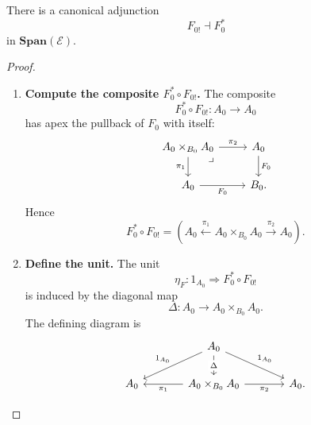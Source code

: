 \begin{proposition}
\label{prop:canonical-span-adjunction}
    There is a canonical adjunction
    \[
        F_{0!}\dashv F_0^\ast
    \]
    in \(\mathbf{Span}(\mathcal E)\).
\end{proposition}
\begin{proof}
    \leavevmode
    \begin{enumerate}
        \item \textbf{Compute the composite \(F_0^\ast\circ F_{0!}\).} The composite
        \[
            F_0^\ast\circ F_{0!}:A_0\to A_0
        \]
        has apex the pullback of \(F_0\) with itself:
        \[
            \begin{tikzcd}
                    A_0\times_{B_0}A_0
                        \arrow[r, "\pi_2"]
                        \arrow[d, "\pi_1"']
                        \arrow[dr, phantom, "\lrcorner", very near start]
                &
                    A_0 
                        \arrow[d, "F_0"]
                \\
                    A_0 
                        \arrow[r, "F_0"']
                &
                    B_0.
            \end{tikzcd}
        \]
        Hence
        \[
            F_0^\ast\circ F_{0!}
            =
            \left(
                A_0
                \xleftarrow{\pi_1}
                A_0\times_{B_0}A_0
                \xrightarrow{\pi_2}
                A_0
            \right).
        \]

        \item \textbf{Define the unit.} The unit
        \[
            \eta_F:1_{A_0}\Rightarrow F_0^\ast\circ F_{0!}
        \]
        is induced by the diagonal map
        \[
            \Delta:A_0\to A_0\times_{B_0}A_0.
        \]
        The defining diagram is
        \[
            \begin{tikzcd}[column sep=large]
                & 
                    A_0 
                        \arrow[d, "\Delta" description] 
                        \arrow[dl, "1_{A_0}"'] 
                        \arrow[dr, "1_{A_0}"] 
                & 
                \\
                    A_0
                &
                    A_0\times_{B_0}A_0
                        \arrow[l, "\pi_1"]
                        \arrow[r, "\pi_2"']
                &
                    A_0.
            \end{tikzcd}
        \]


\end{enumerate}
\end{proof}
